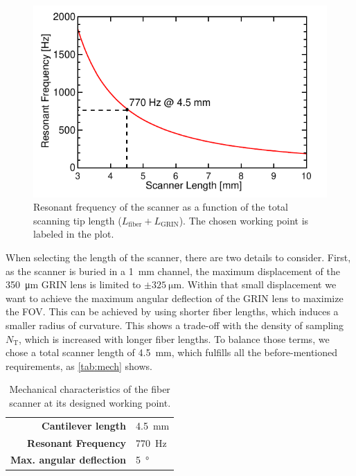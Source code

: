 \documentclass[10pt]{iopart}
\begin{document}
\begin{figure}[h!]\centering
      \includegraphics[width=\columnwidth]{figures/fres.pdf}
      \caption{Resonant frequency of the scanner as a function of the total scanning tip length ($L_\mathrm{fiber} + L_\mathrm{GRIN}$). The chosen working point is labeled in the plot.}
      \label{fig:freq}
\end{figure}

When selecting the length of the scanner, there are two details to consider. First, as the scanner is buried in a \SI{1}{\milli\meter} channel, the maximum displacement of the \SI{350}{\micro\meter} GRIN lens is limited to $\pm\SI{325}{\micro\meter}$. Within that small displacement we want to achieve the maximum angular deflection of the GRIN lens to maximize the FOV. This can be achieved by using shorter fiber lengths, which induces a smaller radius of curvature. This shows a trade-off with the density of sampling $N_\mathrm{T}$, which is increased with longer fiber lengths. To balance those terms, we chose a total scanner length of \SI{4.5}{\milli\meter}, which fulfills all the before-mentioned requirements, as \autoref{tab:mech} shows. 

\begin{table}[h!]\centering
	\caption{Mechanical characteristics of the fiber scanner at its designed working point.}
	\begin{tabular}{rl}\\
		\hline
		\textbf{Cantilever length} & \SI{4.5}{\milli\meter} \\ 
		\textbf{Resonant Frequency} & \SI{770}{\hertz} \\ 
		\textbf{Max. angular deflection} & \SI{5}{\degree} \\ 
		\hline
	\end{tabular} 
    \label{tab:mech}
\end{table}
\end{document}
